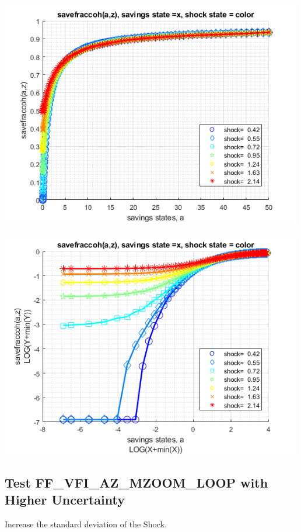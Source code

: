 \documentclass[
]{book}
\begin{document}
\includegraphics[width=5.20833in,height=\textheight]{img/fx_vfi_az_mzoom_loop_images/figure_6.png}

\includegraphics[width=5.20833in,height=\textheight]{img/fx_vfi_az_mzoom_loop_images/figure_7.png}

\hypertarget{test-ff_vfi_az_mzoom_loop-with-higher-uncertainty}{%
\subsection{Test FF\_VFI\_AZ\_MZOOM\_LOOP with Higher Uncertainty}\label{test-ff_vfi_az_mzoom_loop-with-higher-uncertainty}}

Increase the standard deviation of the Shock.
\end{document}
